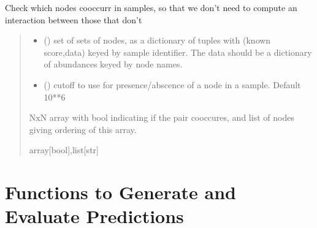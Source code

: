 \documentclass[letterpaper,10pt,english]{sphinxmanual}
\begin{document}
\begin{fulllineitems}
\label{\detokenize{network_build:make_gem_network.check_co_occ}}
\pysigstartsignatures
{}
\pysigstopsignatures
\sphinxAtStartPar
Check which nodes co\sphinxhyphen{}occurr in samples, so that we don’t need to compute an interaction between those that don’t
\begin{quote}\begin{description}
\begin{itemize}
\item {} 
\sphinxAtStartPar
{} (\sphinxstyleliteralemphasis{\sphinxupquote{{[}}}\sphinxstyleliteralemphasis{\sphinxupquote{{[}}}\sphinxstyleliteralemphasis{\sphinxupquote{,}}\sphinxstyleliteralemphasis{\sphinxupquote{{]}}}\sphinxstyleliteralemphasis{\sphinxupquote{{]}}}) \textendash{} set of sets of nodes, as a dictionary of tuples with (known score,data) keyed by sample identifier. The data should be a dictionary of abundances keyed by node names.

\item {} 
\sphinxAtStartPar
{} () \textendash{} cutoff to use for presence/abscence of a node in a sample. Default 10**\sphinxhyphen{}6

\end{itemize}

\sphinxAtStartPar
NxN array with bool indicating if the pair co\sphinxhyphen{}occures, and list of nodes giving ordering of this array.

\sphinxAtStartPar
array{[}bool{]},list{[}str{]}

\end{description}\end{quote}

\end{fulllineitems}


\sphinxstepscope


\chapter{Functions to Generate and Evaluate Predictions}
\label{\detokenize{scoring:functions-to-generate-and-evaluate-predictions}}\label{\detokenize{scoring::doc}}
\end{document}
